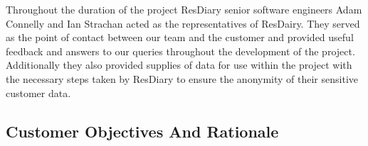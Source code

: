 \documentclass{l3proj}
\begin{document}
Throughout the duration of the project ResDiary senior software engineers Adam Connelly and Ian Strachan acted as the representatives of ResDairy. They served as the point of contact between our team and the customer and provided useful feedback and answers to our queries throughout the development of the project. Additionally they also provided supplies of data for use within the project with the necessary steps taken by ResDiary to ensure the anonymity of their sensitive customer data.

\subsection{Customer Objectives And Rationale}
\label{custobjectives}




\end{document}
